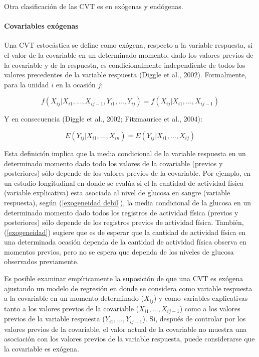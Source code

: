 \documentclass[spanish]{article}
\numberwithin{figure}{subsection}
\numberwithin{equation}{subsection}
\numberwithin{table}{subsection}
\begin{document}
Otra clasificación de las CVT es en exógenas y endógenas.

\paragraph{Covariables exógenas} \mbox{}

Una CVT estocástica se define como exógena, respecto a la variable respuesta, si
el valor de la covariable en un determinado momento, dado los valores previos de
la covariable y de la respuesta, es condicionalmente independiente de todos los
valores precedentes de la variable respuesta (Diggle et al., 2002). Formalmente,
para la unidad $i$ en la ocasión $j$:  

\begin{equation}
	\label{exogeneidad}
	f(X_{ij}|X_{i1}, ..., X_{ij-1}, Y_{i1}, ..., Y_{ij}) =
	f(X_{ij}|X_{i1}, ..., X_{ij-1})
\end{equation}

Y en consecuencia (Diggle et al., 2002; Fitzmaurice et al., 2004):

\begin{equation}
	\label{exogeneidad debil}
	E(Y_{ij}|X_{i1}, ..., X_{in}) = E(Y_{ij}|X_{i1}, ..., X_{ij})
\end{equation}

Esta definición implica que la media condicional de la variable respuesta en un
determinado momento dado todo los valores de la covariable (previos y
posteriores) sólo depende de los valores previos de la covariable. Por ejemplo,
en un estudio longitudinal en donde se evalúa si el la cantidad de actividad
física (variable explicativa) esta asociada al nivel de glucosa en sangre
(variable respuesta), según (\ref{exogeneidad debil}), la media condicional de
la glucosa en un determinado momento dado todos los registros de actividad
física (previos y posteriores) sólo depende de los registros previos de
actividad física. También, (\ref{exogeneidad}) sugiere que es de esperar que la
cantidad de actividad física en una determinada ocasión dependa de la cantidad
de actividad física observa en momentos previos, pero no se espera que dependa
de los niveles de glucosa observados previamente.

Es posible examinar empíricamente la suposición de que una CVT es exógena
ajustando un modelo de regresión en donde se considera como variable respuesta a
la covariable en un momento determinado ($X_{ij}$) y como variables explicativas
tanto a los valores previos de la covariable ($X_{i1}, ..., X_{ij-1}$) como a
los valores previos de la variable respuesta ($Y_{i1}, ..., Y_{ij-1}$). Si,
después de controlar por los valores previos de la covariable, el valor actual
de la covariable no muestra una asociación con los valores previos de la
variable respuesta, puede considerarse que la covariable es exógena.
\end{document}
